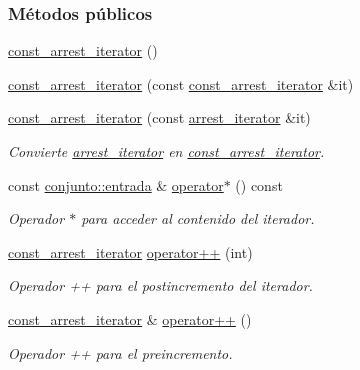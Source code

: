 \subsubsection*{Métodos públicos}
\begin{DoxyCompactItemize}
\item 
\hyperlink{classconjunto_1_1const__arrest__iterator_a17593c0f16b6415338de463d0149f87c}{const\-\_\-arrest\-\_\-iterator} ()
\item 
\hyperlink{classconjunto_1_1const__arrest__iterator_ad4eb101c5b76e1d44a7d5d674b134476}{const\-\_\-arrest\-\_\-iterator} (const \hyperlink{classconjunto_1_1const__arrest__iterator}{const\-\_\-arrest\-\_\-iterator} \&it)
\item 
\hyperlink{classconjunto_1_1const__arrest__iterator_aab0fb16a64c360f64005a205a577b6de}{const\-\_\-arrest\-\_\-iterator} (const \hyperlink{classconjunto_1_1arrest__iterator}{arrest\-\_\-iterator} \&it)
\begin{DoxyCompactList}\small\item\em Convierte \hyperlink{classconjunto_1_1arrest__iterator}{arrest\-\_\-iterator} en \hyperlink{classconjunto_1_1const__arrest__iterator}{const\-\_\-arrest\-\_\-iterator}. \end{DoxyCompactList}\item 
const \hyperlink{classconjunto_a09cad766dd65de73e51eae21f9d22585}{conjunto\-::entrada} \& \hyperlink{classconjunto_1_1const__arrest__iterator_acfe98645f0a93c2f085ed04f102e2f20}{operator$\ast$} () const 
\begin{DoxyCompactList}\small\item\em Operador $\ast$ para acceder al contenido del iterador. \end{DoxyCompactList}\item 
\hyperlink{classconjunto_1_1const__arrest__iterator}{const\-\_\-arrest\-\_\-iterator} \hyperlink{classconjunto_1_1const__arrest__iterator_abd10935467e56b74188eacc8b5cebe60}{operator++} (int)
\begin{DoxyCompactList}\small\item\em Operador ++ para el postincremento del iterador. \end{DoxyCompactList}\item 
\hyperlink{classconjunto_1_1const__arrest__iterator}{const\-\_\-arrest\-\_\-iterator} \& \hyperlink{classconjunto_1_1const__arrest__iterator_af3c85b5fd208bf18eb809a0ead07f155}{operator++} ()
\begin{DoxyCompactList}\small\item\em Operador ++ para el preincremento. \end{DoxyCompactList}\item 

\end{DoxyCompactItemize}
